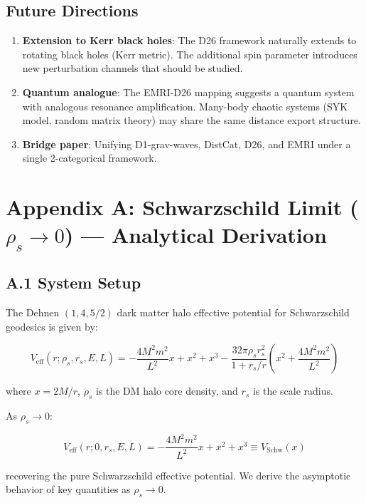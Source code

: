 \documentclass[12pt]{article}
\begin{document}
\subsection{Future Directions}

\begin{enumerate}
\item \textbf{Extension to Kerr black holes}: The D26 framework naturally extends to rotating black holes (Kerr metric). The additional spin parameter introduces new perturbation channels that should be studied.
\item \textbf{Quantum analogue}: The EMRI-D26 mapping suggests a quantum system with analogous resonance amplification. Many-body chaotic systems (SYK model, random matrix theory) may share the same distance export structure.
\item \textbf{Bridge paper}: Unifying D1-grav-waves, DistCat, D26, and EMRI under a single 2-categorical framework.
\end{enumerate}

\appendix

\section{Appendix A: Schwarzschild Limit ($\rho_s \to 0$) — Analytical Derivation}

\subsection{A.1 System Setup}

The Dehnen $(1,4,5/2)$ dark matter halo effective potential for Schwarzschild geodesics is given by:

\begin{equation}
V_{\text{eff}}(r; \rho_s, r_s, E, L) = -\frac{4M^2 m^2}{L^2} x + x^2 + x^3 - \frac{32\pi\rho_s r_s^2}{1+r_s/r} \left(x^2 + \frac{4M^2 m^2}{L^2}\right)
\end{equation}

where $x = 2M/r$, $\rho_s$ is the DM halo core density, and $r_s$ is the scale radius.

As $\rho_s \to 0$:

\begin{equation}
V_{\text{eff}}(r; 0, r_s, E, L) = -\frac{4M^2 m^2}{L^2} x + x^2 + x^3 \equiv V_{\text{Schw}}(x)
\end{equation}

recovering the pure Schwarzschild effective potential. We derive the asymptotic behavior of key quantities as $\rho_s \to 0$.
\end{document}
